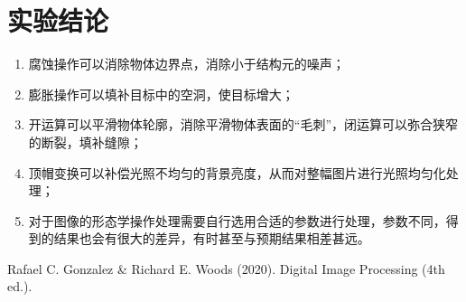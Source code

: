 \documentclass{hitreport}
\begin{document}
\section{实验结论}

\begin{enumerate}
\item 腐蚀操作可以消除物体边界点，消除小于结构元的噪声；
\item 膨胀操作可以填补目标中的空洞，使目标增大；
\item 开运算可以平滑物体轮廓，消除平滑物体表面的“毛刺”，闭运算可以弥合狭窄的断裂，填补缝隙；
\item 顶帽变换可以补偿光照不均匀的背景亮度，从而对整幅图片进行光照均匀化处理；
\item 对于图像的形态学操作处理需要自行选用合适的参数进行处理，参数不同，得到的结果也会有很大的差异，有时甚至与预期结果相差甚远。
\end{enumerate}

\renewcommand\refname{参考文献}
 
\begin{thebibliography}{1}
Rafael C. Gonzalez \& Richard E. Woods (2020). Digital Image Processing (4th ed.).

\end{thebibliography}
\end{document}
